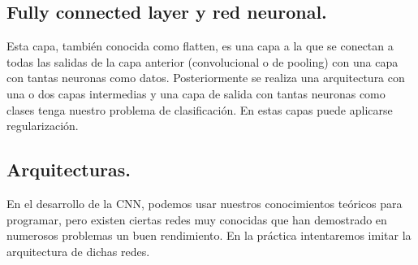 \documentclass[a4paper,10pt]{article}
\begin{document}
\subsection{Fully connected layer y red neuronal.}
Esta capa, también conocida como flatten, es una capa a la que se conectan a todas las salidas de la capa anterior (convolucional o de pooling) con una capa con tantas neuronas como datos. Posteriormente se realiza una arquitectura con una o dos capas intermedias y una capa de salida con tantas neuronas como clases tenga nuestro problema de clasificación. En estas capas puede aplicarse regularización.
\subsection{Arquitecturas.}
En el desarrollo de la CNN, podemos usar nuestros conocimientos teóricos para programar, pero existen ciertas redes muy conocidas que han demostrado en numerosos problemas un buen rendimiento. En la práctica intentaremos imitar la arquitectura de dichas redes.
\end{document}
